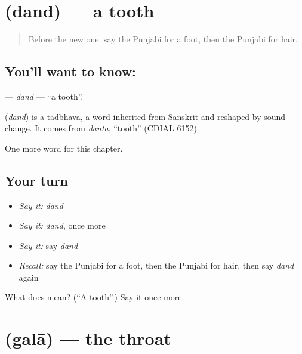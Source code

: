 \section[\texorpdfstring{\pa{ਦੰਦ} (dand)}{ਦੰਦ (dand)}]{ (dand) — a tooth}

\label{lesson:PA-C49-dand}



\begin{quote}
Before the new one: say the Punjabi for a foot, then the Punjabi for hair.
\end{quote}

\subsection*{You'll want to know: }
\textbf{} — \emph{dand} — \textquotedblleft{}a tooth\textquotedblright{}.

\begin{cousinweb}
\textbf{} (\emph{dand}) is a tadbhava, a word inherited from Sanskrit and reshaped by sound change. It comes from \emph{danta}, \textquotedblleft{}tooth\textquotedblright{} (CDIAL 6152).
\end{cousinweb}

\begin{grammarlens}[title={What you've built}]
One more word for this chapter.
\end{grammarlens}

\subsection*{Your turn}
\begin{itemize}
\raggedright
  \item \emph{Say it:} \emph{dand}
  \item \emph{Say it:} \emph{dand}, once more
  \item \emph{Say it:} say \emph{dand}
  \item \emph{Recall:} say the Punjabi for a foot, then the Punjabi for hair, then say \emph{dand} again
\end{itemize}

\begin{tcolorbox}[breakable,colback=teal!4,colframe=teal!35!black,title={Before you move on}]
What does  mean? (\textquotedblleft{}A tooth\textquotedblright{}.) Say it once more.
\end{tcolorbox}
\section[\texorpdfstring{\pa{ਗਲਾ} (galā)}{ਗਲਾ (galā)}]{ (galā) — the throat}

